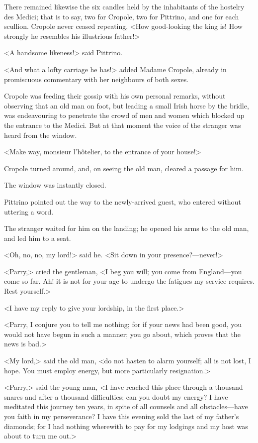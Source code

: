 There remained likewise the six candles held by the inhabitants of the hostelry des Medici; that is to say, two for Cropole, two for Pittrino, and one for each scullion. Cropole never ceased repeating, <How good-looking the king is! How strongly he resembles his illustrious father!>

<A handsome likeness!> said Pittrino.

<And what a lofty carriage he has!> added Madame Cropole, already in promiscuous commentary with her neighbours of both sexes.

Cropole was feeding their gossip with his own personal remarks, without observing that an old man on foot, but leading a small Irish horse by the bridle, was endeavouring to penetrate the crowd of men and women which blocked up the entrance to the Medici. But at that moment the voice of the stranger was heard from the window.

<Make way, monsieur l'hôtelier, to the entrance of your house!>

Cropole turned around, and, on seeing the old man, cleared a passage for him.

The window was instantly closed.

Pittrino pointed out the way to the newly-arrived guest, who entered without uttering a word.

The stranger waited for him on the landing; he opened his arms to the old man, and led him to a seat.

<Oh, no, no, my lord!> said he. <Sit down in your presence?—never!>

<Parry,> cried the gentleman, <I beg you will; you come from England—you come so far. Ah! it is not for your age to undergo the fatigues my service requires. Rest yourself.>

<I have my reply to give your lordship, in the first place.>

<Parry, I conjure you to tell me nothing; for if your news had been good, you would not have begun in such a manner; you go about, which proves that the news is bad.>

<My lord,> said the old man, <do not hasten to alarm yourself; all is not lost, I hope. You must employ energy, but more particularly resignation.>

<Parry,> said the young man, <I have reached this place through a thousand snares and after a thousand difficulties; can you doubt my energy? I have meditated this journey ten years, in spite of all counsels and all obstacles—have you faith in my perseverance? I have this evening sold the last of my father's diamonds; for I had nothing wherewith to pay for my lodgings and my host was about to turn me out.>

